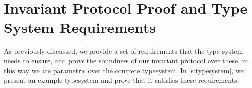 \ifx\relax\undefined%
	\newcommand{\HNO}{\mathit{headNotObservable}}
	\newcommand{\dom}{\mathit{dom}}
	\newcommand{\CR}{\mathit{circular}}
	\newcommand{\CN}{\mathit{confined}}
	\newcommand{\RCR}{\mathit{repCircular}}
	\newcommand{\RCN}{\mathit{repConfined}}
	\newcommand{\RM}{\mathit{repMutating}}
	\newcommand{\rog}{\mathit{ROG}}
	\newcommand{\mrog}{\mathit{mROG}}
	\newcommand{\rf}{\mathit{repFields}}
	\newcommand{\muty}{\mathit{mutatable}}
	\newcommand{\mony}{\mathit{monitored}}
	\newcommand{\valid}{\mathit{valid}}
	\newcommand{\trusted}{\mathit{trusted}}
	\newcommand{\reach}{\mathit{reachable}}
	\newcommand{\error}{\mathit{error}}
	\newcommand{\encap}{\mathit{encapsulated}}
	\newcommand{\immut}{\mathit{immutable}}
	\newcommand{\VS}{\mathit{validState}}
	\newcommand{\V}[1]{#1}
	\newcommand{\Kw}[1]{\texttt{#1}}

	\newcommand{\rangeX}[3][,]{\ensuremath{#2 #1 \ldots #1 #3}}
	\newcommand{\range}[2][,]{\rangeX[#1]{#2_1}{#2_n}}
	\newcommand{\drange}[3][,]{#2_1\,#3_1 #1\ldots#1 #2_n\,#3_n}
	\newcommand{\trange}[4][,]{\rangeX[#1]{#2_1\,#3_1\,#4_1}{#2_n\,#3_n\,#4_n}}
	\newcommand{\drangex}[3][,]{\rangeX[#1]{#2_1\,#3}{#2_n\,#3}}
	\newcommand{\trangex}[4][,]{\rangeX[#1]{#2_1\,#3_1\,#4}{#2_n\,#3_n\,#4}}

	\newcommand{\Terminale}[1]{\Kw{#1}}
	\newcommand{\ensuremath}[1]{#1}
	\newcommand{\xspace}{}
	\newcommand{\myCalBig}[1]{\mathcal{#1}}

	\newcommand{\textsc}[1]{\textsf{#1}}

	\newcommand{\equals}{\,\Kw{=}\,}

	\newcommand{\D}{\texttt{.}}
	\newcommand{\mdf}{\mu}
	\newcommand{\fmdf}{\kappa}

	\newcommand{\eup}{\mdf\,l\D f\equals w}
\fi

\section{Invariant Protocol Proof and Type System Requirements}

\lstset{language=FortyFour} %
\label{s:proof}
As previously discussed, we provide a set of requirements that the type system needs to ensure, and prove the soundness of our invariant protocol over these,
in this way we are parametric over the concrete typesystem. In \autoref{s:typesystem}, we present an example typesystem and prove that it satisfies these requirements.

